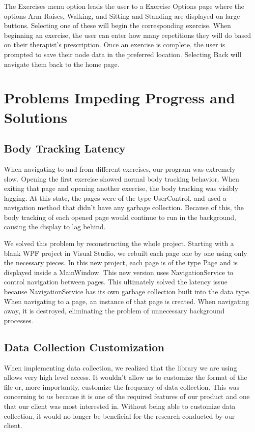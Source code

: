 \documentclass[onecolumn, draftclsnofoot,10pt, compsoc]{IEEEtran}
\begin{document}
The Exercises menu option leads the user to a Exercise Options page where the options Arm Raises, Walking, and Sitting and Standing are displayed on large buttons. Selecting one of these will begin the corresponding exercise. When beginning an exercise, the user can enter how many repetitions they will do based on their therapist's prescription. Once an exercise is complete, the user is prompted to save their node data in the preferred location. Selecting Back will navigate them back to the home page. 

\section{Problems Impeding Progress and Solutions}
\subsection{Body Tracking Latency}
When navigating to and from different exercises, our program was extremely slow. Opening the first exercise showed normal body tracking behavior. When exiting that page and opening another exercise, the body tracking was visibly lagging. At this state, the pages were of the type UserControl, and used a navigation method that didn't have any garbage collection. Because of this, the body tracking of each opened page would continue to run in the background, causing the display to lag behind.

We solved this problem by reconstructing the whole project. Starting with a blank WPF project in Visual Studio, we rebuilt each page one by one using only the necessary pieces. In this new project, each page is of the type Page and is displayed inside a MainWindow. This new version uses NavigationService to control navigation between pages. This ultimately solved the latency issue because NavigationService has its own garbage collection built into the data type. When navigating to a page, an instance of that page is created. When navigating away, it is destroyed, eliminating the problem of unnecessary background processes.

\subsection{Data Collection Customization}
When implementing data collection, we realized that the library we are using allows very high level access. It wouldn't allow us to customize the format of the file or, more importantly, customize the frequency of data collection. This was concerning to us because it is one of the required features of our product and one that our client was most interested in. Without being able to customize data collection, it would no longer be beneficial for the research conducted by our client.
\end{document}

